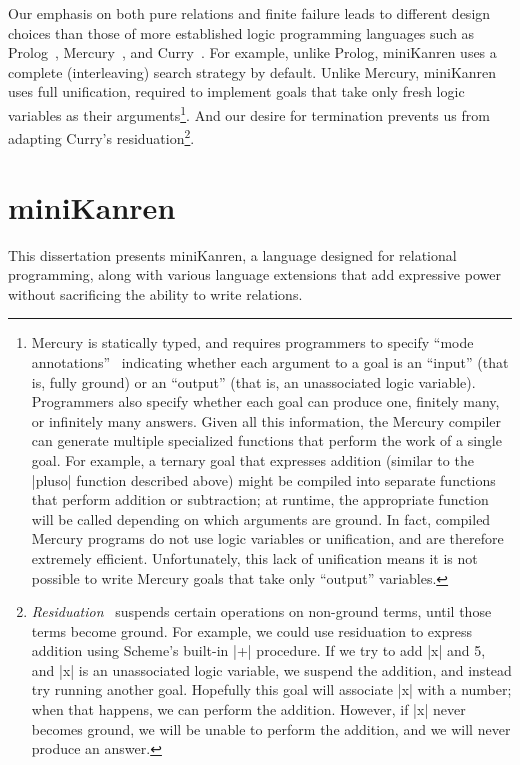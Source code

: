 Our emphasis on both pure relations and finite failure leads to
different design choices than those of more established logic
programming languages such as
Prolog~\cite{ISO:1995:IIIe,ISO:2000:IIIf},
Mercury~\cite{Somogyi95mercury}, and
Curry~\cite{Hanus95curry:a,Hanus06}.  For example, unlike Prolog,
miniKanren uses a complete (interleaving) search strategy by default.
Unlike Mercury, miniKanren uses full unification, required to
implement goals that take only fresh logic variables as their
arguments\footnote{Mercury is statically typed, and requires
  programmers to specify ``mode
  annotations''~\cite{Apt94reasoningabout} indicating whether each
  argument to a goal is an ``input'' (that is, fully ground) or an
  ``output'' (that is, an unassociated logic variable).  Programmers
  also specify whether each goal can produce one, finitely many, or
  infinitely many answers.  Given all this information, the Mercury
  compiler can generate multiple specialized functions that perform
  the work of a single goal.  For example, a ternary goal that
  expresses addition (similar to the \scheme|pluso| function described
  above) might be compiled into separate functions that perform
  addition or subtraction; at runtime, the appropriate function will
  be called depending on which arguments are ground.  In fact,
  compiled Mercury programs do not use logic variables or unification,
  and are therefore extremely efficient.  Unfortunately, this lack of
  unification means it is not possible to write Mercury goals that
  take only ``output'' variables.}.  And our desire for termination
prevents us from adapting Curry's
residuation\footnote{\emph{Residuation}~\cite{hanus:jlp95} suspends
  certain operations on non-ground terms, until those terms become
  ground.  For example, we could use residuation to express addition
  using Scheme's built-in \scheme|+| procedure.  If we try to add
  \scheme|x| and 5, and \scheme|x| is an unassociated logic variable,
  we suspend the addition, and instead try running another goal.
  Hopefully this goal will associate \scheme|x| with a number; when
  that happens, we can perform the addition.  However, if \scheme|x|
  never becomes ground, we will be unable to perform the addition, and
  we will never produce an answer.}.

\section{miniKanren}

This dissertation presents miniKanren, a language designed for
relational programming, along with various language extensions that
add expressive power without sacrificing the ability to write
relations.

